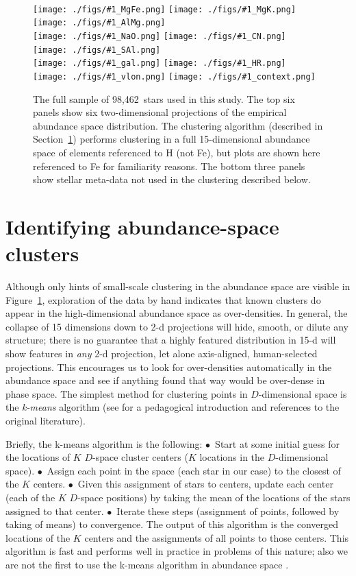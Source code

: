 \documentclass[manuscript, letterpaper]{aastex6}
\newcommand{\sectionname}{Section}
\renewcommand{\figurename}{Figure} %
\newcommand{\insanefigure}[1]{\rule{0ex}{\headsep}\\%
\texttt{[image: ./figs/\#1\_MgFe.png]}%
\texttt{[image: ./figs/\#1\_MgK.png]}%
\texttt{[image: ./figs/\#1\_AlMg.png]}\\
\texttt{[image: ./figs/\#1\_NaO.png]}%
\texttt{[image: ./figs/\#1\_CN.png]}%
\texttt{[image: ./figs/\#1\_SAl.png]}\\
\texttt{[image: ./figs/\#1\_gal.png]}%
\texttt{[image: ./figs/\#1\_HR.png]}\\
\texttt{[image: ./figs/\#1\_vlon.png]}%
\texttt{[image: ./figs/\#1\_context.png]}}
\newcommand{\totalnumber}{98,462}
\begin{document}
\begin{figure}[!p]
\insanefigure{all}
\caption{The full sample of \totalnumber\ stars used in this study.
  The top six panels show six two-dimensional projections of the
  empirical abundance space distribution.
  The clustering algorithm (described in
  \sectionname~\ref{sec:method}) performs clustering in a full
  15-dimensional abundance space of elements referenced to H (not Fe),
  but plots are shown here referenced to Fe for familiarity reasons.
  The bottom three panels show stellar meta-data not used in the
  clustering described below.\label{fig:all}}
\end{figure}

\clearpage
\section{Identifying abundance-space clusters}\label{sec:method}

Although only hints of small-scale clustering in the abundance space
are visible in \figurename~\ref{fig:all}, exploration of the data by hand indicates that
known clusters do appear in the high-dimensional abundance space as over-densities.
In general, the collapse of 15 dimensions down to 2-d projections
will hide, smooth, or dilute any structure; there is no guarantee that
a highly featured distribution in 15-d will show features in
\emph{any} 2-d projection, let alone axis-aligned, human-selected projections.
This encourages us to look for over-densities automatically in the
abundance space and see if anything found that way would be over-dense
in phase space.
The simplest method for clustering points in $D$-dimensional space is
the \emph{k-means} algorithm (see \citealt{bishop} for a pedagogical
introduction and references to the original literature).

Briefly, the k-means algorithm is the following:
$\bullet$~Start at some initial guess for the locations of $K$ $D$-space cluster centers ($K$
locations in the $D$-dimensional space).
$\bullet$~Assign each point in the
space (each star in our case) to the closest of the $K$ centers.
$\bullet$~Given this assignment of stars to centers, update each center (each of
the $K$ $D$-space positions) by taking the mean of the locations of
the stars assigned to that center.
$\bullet$~Iterate these steps (assignment of points, followed by taking of means) to convergence.
The output of this algorithm is the converged locations of the $K$ centers and the assignments of
all points to those centers.
This algorithm is fast and performs well in practice in problems of
this nature; also we are not the first to use the k-means algorithm in
abundance space \citep{gratton}.
\end{document}
